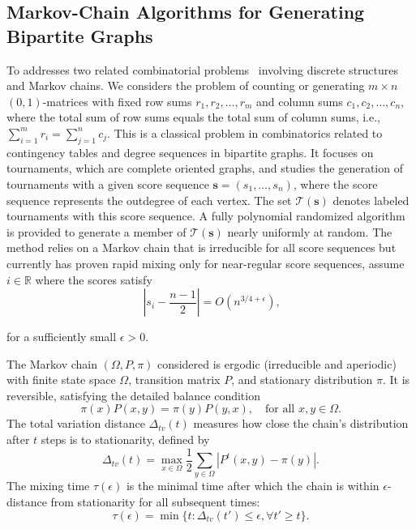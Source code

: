 \documentclass{article}
\theoremstyle{definition}
\begin{document}
\subsection{Markov-Chain Algorithms for Generating Bipartite Graphs}
To addresses two related combinatorial problems~\cite{KannanRWTetali} involving discrete structures and Markov chains. We considers the problem of counting or generating $m \times n$ $(0,1)$-matrices with fixed row sums $r_1, r_2, \ldots, r_m$ and column sums $c_1, c_2, \ldots, c_n$, where the total sum of row sums equals the total sum of column sums, i.e., $\sum_{i=1}^m r_i = \sum_{j=1}^n c_j$. This is a classical problem in combinatorics related to contingency tables and degree sequences in bipartite graphs. It focuses on tournaments, which are complete oriented graphs, and studies the generation of tournaments with a given score sequence $\mathbf{s} = (s_1, \ldots, s_n)$, where the score sequence represents the outdegree of each vertex. The set $\mathscr{T}(\mathbf{s})$ denotes labeled tournaments with this score sequence. A fully polynomial randomized algorithm is provided to generate a member of $\mathscr{T}(\mathbf{s})$ nearly uniformly at random. The method relies on a Markov chain that is irreducible for all score sequences but currently has proven rapid mixing only for near-regular score sequences, assume $i\in \mathbb{R}$ where the scores satisfy 
\begin{equation}~\label{eqwern1}
\left| s_i - \frac{n-1}{2} \right| = O\left( n^{3/4 + \epsilon} \right),
\end{equation}

for a sufficiently small $\epsilon > 0$.

The Markov chain $(\Omega, P, \pi)$ considered is ergodic (irreducible and aperiodic) with finite state space $\Omega$, transition matrix $P$, and stationary distribution $\pi$. It is reversible, satisfying the detailed balance condition 
\[
\pi(x) P(x,y) = \pi(y) P(y,x), \quad \text{for all } x,y \in \Omega.
\] 
The total variation distance $\Delta_{tv}(t)$ measures how close the chain's distribution after $t$ steps is to stationarity, defined by 
\[
\Delta_{tv}(t) = \max_{x \in \Omega} \frac{1}{2} \sum_{y \in \Omega} \left| P^t(x,y) - \pi(y) \right|.
\]
The mixing time $\tau(\epsilon)$ is the minimal time after which the chain is within $\epsilon$-distance from stationarity for all subsequent times:
\[
\tau(\epsilon) = \min \{ t : \Delta_{tv}(t') \leq \epsilon, \forall t' \geq t \}.
\]
\end{document}
